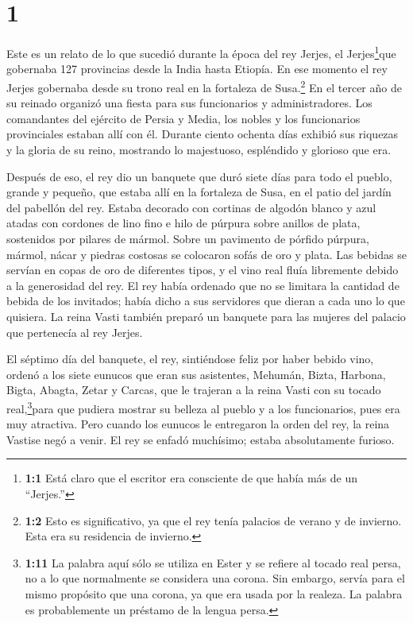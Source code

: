 \hypertarget{section}{%
\section{1}\label{section}}

 Este es un relato de lo que sucedió durante la época del
rey Jerjes, el Jerjes\footnote{\textbf{1:1} Está claro que el escritor
  era consciente de que había más de un ``Jerjes.''}que gobernaba 127
provincias desde la India hasta Etiopía.  En ese momento el
rey Jerjes gobernaba desde su trono real en la fortaleza de
Susa.\footnote{\textbf{1:2} Esto es significativo, ya que el rey tenía
  palacios de verano y de invierno. Esta era su residencia de invierno.}
 En el tercer año de su reinado organizó una fiesta para sus
funcionarios y administradores. Los comandantes del ejército de Persia y
Media, los nobles y los funcionarios provinciales estaban allí con él.
 Durante ciento ochenta días exhibió sus riquezas y la
gloria de su reino, mostrando lo majestuoso, espléndido y glorioso que
era.

 Después de eso, el rey dio un banquete que duró siete días
para todo el pueblo, grande y pequeño, que estaba allí en la fortaleza
de Susa, en el patio del jardín del pabellón del rey. 
Estaba decorado con cortinas de algodón blanco y azul atadas con
cordones de lino fino e hilo de púrpura sobre anillos de plata,
sostenidos por pilares de mármol. Sobre un pavimento de pórfido púrpura,
mármol, nácar y piedras costosas se colocaron sofás de oro y plata.
 Las bebidas se servían en copas de oro de diferentes tipos,
y el vino real fluía libremente debido a la generosidad del rey.
 El rey había ordenado que no se limitara la cantidad de
bebida de los invitados; había dicho a sus servidores que dieran a cada
uno lo que quisiera.  La reina Vasti también preparó un
banquete para las mujeres del palacio que pertenecía al rey Jerjes.

 El séptimo día del banquete, el rey, sintiéndose feliz por
haber bebido vino, ordenó a los siete eunucos que eran sus asistentes,
Mehumán, Bizta, Harbona, Bigta, Abagta, Zetar y Carcas, 
que le trajeran a la reina Vasti con su tocado real,\footnote{\textbf{1:11}
  La palabra aquí sólo se utiliza en Ester y se refiere al tocado real
  persa, no a lo que normalmente se considera una corona. Sin embargo,
  servía para el mismo propósito que una corona, ya que era usada por la
  realeza. La palabra es probablemente un préstamo de la lengua persa.}para
que pudiera mostrar su belleza al pueblo y a los funcionarios, pues era
muy atractiva.  Pero cuando los eunucos le entregaron la
orden del rey, la reina Vastise negó a venir. El rey se enfadó
muchísimo; estaba absolutamente furioso.

